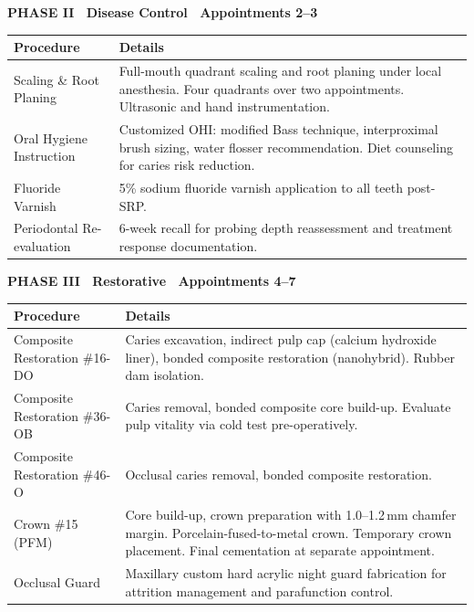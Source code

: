 \documentclass[11pt,a4paper]{article}
\begin{document}
\vspace{3mm}

\begin{phasebox}[colback=accent!8, colframe=accent!50]
  {\bfseries\color{accent!80!black}PHASE II \textbar\ Disease Control \textbar\ Appointments 2--3}\\[2mm]
  \begin{tabular}{@{}L{7cm} L{7cm}@{}}
    \textbf{Procedure} & \textbf{Details} \\ \midrule
    Scaling \& Root Planing & Full-mouth quadrant scaling and root planing under local anesthesia. Four quadrants over two appointments. Ultrasonic and hand instrumentation. \\
    Oral Hygiene Instruction & Customized OHI: modified Bass technique, interproximal brush sizing, water flosser recommendation. Diet counseling for caries risk reduction. \\
    Fluoride Varnish & 5\% sodium fluoride varnish application to all teeth post-SRP. \\
    Periodontal Re-evaluation & 6-week recall for probing depth reassessment and treatment response documentation. \\
  \end{tabular}
\end{phasebox}

\vspace{3mm}

\begin{phasebox}[colback=warning!10, colframe=warning!60]
  {\bfseries\color{warning!70!black}PHASE III \textbar\ Restorative \textbar\ Appointments 4--7}\\[2mm]
  \begin{tabular}{@{}L{7cm} L{7cm}@{}}
    \textbf{Procedure} & \textbf{Details} \\ \midrule
    Composite Restoration \#16-DO & Caries excavation, indirect pulp cap (calcium hydroxide liner), bonded composite restoration (nanohybrid). Rubber dam isolation. \\
    Composite Restoration \#36-OB & Caries removal, bonded composite core build-up. Evaluate pulp vitality via cold test pre-operatively. \\
    Composite Restoration \#46-O & Occlusal caries removal, bonded composite restoration. \\
    Crown \#15 (PFM) & Core build-up, crown preparation with 1.0--1.2\,mm chamfer margin. Porcelain-fused-to-metal crown. Temporary crown placement. Final cementation at separate appointment. \\
    Occlusal Guard & Maxillary custom hard acrylic night guard fabrication for attrition management and parafunction control. \\
  \end{tabular}
\end{phasebox}
\end{document}

